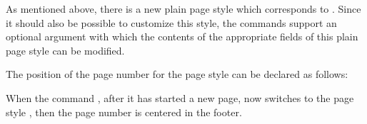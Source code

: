 As mentioned above, there is a new plain page style which corresponds to
. Since it should also be possible to customize this
style, the commands support an optional argument with which the contents of
the appropriate fields of this plain page style can be modified.

\begin{Example}
  The position of the page number for the page style 
  can be declared as follows:
\begin{lstcode}
  \cfoot[\pagemark]{}
  \ohead[]{\pagemark}
\end{lstcode}
  When the command , after it has started a new page, now
  switches to the page style , then the page number is
  centered in the footer.
\end{Example}
%
%
%


